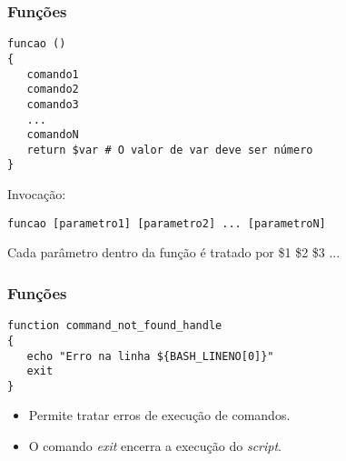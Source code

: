 \documentclass{beamer}
\begin{document}
   \begin{frame}[fragile]
      \frametitle{Funções}
      \begin{verbatim}
funcao ()
{
   comando1
   comando2
   comando3
   ...
   comandoN
   return $var # O valor de var deve ser número
}
   \end{verbatim}
      Invocação:
      \begin{verbatim}
funcao [parametro1] [parametro2] ... [parametroN] 
      \end{verbatim}
      Cada parâmetro dentro da função é tratado por \$1 \$2 \$3 ...
\end{frame}


   \begin{frame}[fragile]
      \frametitle{Funções}
      \begin{verbatim}
function command_not_found_handle
{
   echo "Erro na linha ${BASH_LINENO[0]}"
   exit      
}
      \end{verbatim}
      \begin{itemize}
         \item Permite tratar erros de execução de comandos.
         \item O comando \textit{exit} encerra a execução do \textit{script}.
      \end{itemize}
\end{frame}
\end{document}
